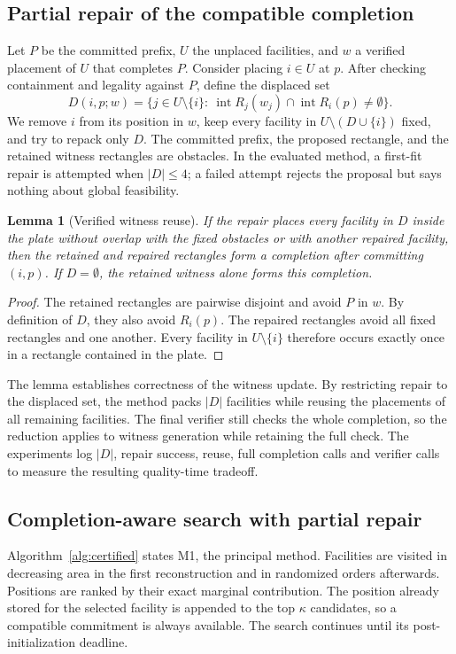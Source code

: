 \documentclass[preprint,12pt,authoryear,nonatbib]{elsarticle}
\newtheorem{lem}{Lemma}
\begin{document}
\subsection{Partial repair of the compatible completion}
\label{sec:partialrepair}

Let $P$ be the committed prefix, $U$ the unplaced facilities, and $w$ a verified
placement of $U$ that completes $P$. Consider placing $i\in U$ at $p$. After
checking containment and legality against $P$, define the displaced set
\begin{equation}
D(i,p;w)=\{j\in U\setminus\{i\}:\
\operatorname{int}R_j(w_j)\cap\operatorname{int}R_i(p)\ne\emptyset\}.
\label{eq:displaced}
\end{equation}
We remove $i$ from its position in $w$, keep every facility in
$U\setminus(D\cup\{i\})$ fixed, and try to repack only $D$. The committed prefix,
the proposed rectangle, and the retained witness rectangles are obstacles. In
the evaluated method, a first-fit repair is attempted when $|D|\le4$; a failed
attempt rejects the proposal but says nothing about global feasibility.

\begin{lem}[Verified witness reuse]
\label{lem:repair}
If the repair places every facility in $D$ inside the plate without overlap
with the fixed obstacles or with another repaired facility, then the retained
and repaired rectangles form a completion after committing $(i,p)$. If
$D=\emptyset$, the retained witness alone forms this completion.
\end{lem}
\begin{proof}
The retained rectangles are pairwise disjoint and avoid $P$ in $w$.
By definition of $D$, they also avoid $R_i(p)$. The repaired rectangles
avoid all fixed rectangles and one another. Every facility in $U\setminus\{i\}$
therefore occurs exactly once in a rectangle contained in the plate.
\end{proof}

The lemma establishes correctness of the witness update. By restricting repair
to the displaced set, the method packs $|D|$ facilities while reusing the
placements of all remaining facilities. The final verifier still checks the whole completion, so
the reduction applies to witness generation while retaining the full check. The
experiments log $|D|$, repair success, reuse, full completion calls and verifier
calls to measure the resulting quality-time tradeoff.


\subsection{Completion-aware search with partial repair}
Algorithm~\ref{alg:certified} states M1, the principal method. Facilities are
visited in decreasing area in the first reconstruction and in randomized orders
afterwards. Positions are ranked by their exact marginal contribution. The
position already stored for the selected facility is appended to the top
$\kappa$ candidates, so a compatible commitment is always available. The search
continues until its post-initialization deadline.
\end{document}
